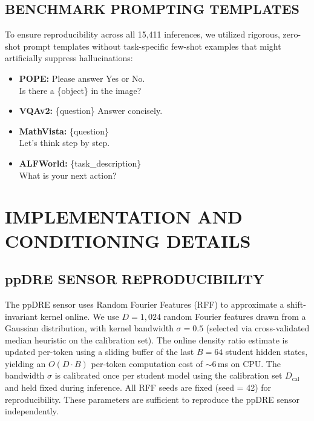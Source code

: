 \documentclass{ieeetmlcn}
\begin{document}
\subsection{BENCHMARK PROMPTING TEMPLATES}
To ensure reproducibility across all 15,411 inferences, we utilized rigorous, zero-shot prompt templates without task-specific few-shot examples that might artificially suppress hallucinations:
\begin{itemize}
\item \textbf{POPE:} {\small\ttfamily [Image] Please answer Yes or No.\\Is there a \{object\} in the image?}
\item \textbf{VQAv2:} {\small\ttfamily [Image] \{question\} Answer concisely.}
\item \textbf{MathVista:} {\small\ttfamily [Image] \{question\}\\Let's think step by step.}
\item \textbf{ALFWorld:} {\small\ttfamily [Task] \{task\_description\}\\What is your next action?}
\end{itemize}


\section{IMPLEMENTATION AND CONDITIONING DETAILS}
\label{app:implementation}

\subsection{ppDRE SENSOR REPRODUCIBILITY}
The ppDRE sensor uses Random Fourier Features (RFF) \cite{rahimi2007random} to approximate a shift-invariant kernel online. We use $D = 1{,}024$ random Fourier features drawn from a Gaussian distribution, with kernel bandwidth $\sigma = 0.5$ (selected via cross-validated median heuristic on the calibration set). The online density ratio estimate is updated per-token using a sliding buffer of the last $B = 64$ student hidden states, yielding an $O(D \cdot B)$ per-token computation cost of $\sim$6\,ms on CPU. The bandwidth $\sigma$ is calibrated once per student model using the calibration set $D_{\text{cal}}$ and held fixed during inference. All RFF seeds are fixed (seed = 42) for reproducibility. These parameters are sufficient to reproduce the ppDRE sensor independently.
\end{document}
